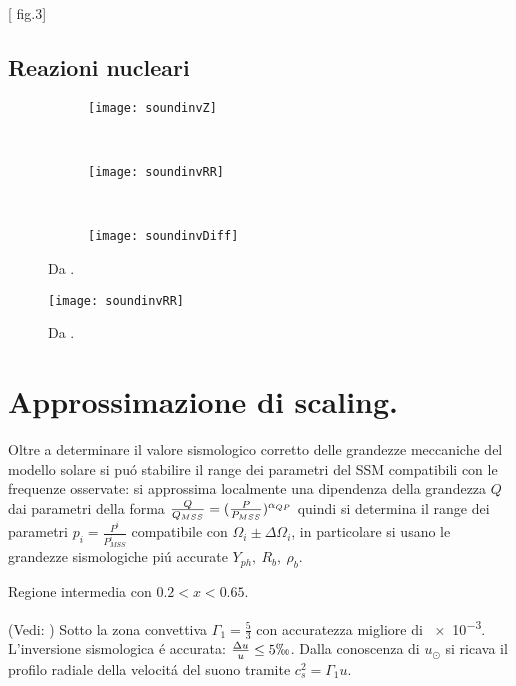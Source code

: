 \documentclass[../main.tex]{subfiles}
\begin{document}
[\cite{deg97helioseismology} fig.3]


\subsection{Reazioni nucleari}


\begin{figure}[!h]
\centering

\begin{subfigure}[t]{0.32\textwidth}
\texttt{[image: soundinvZ]}
\end{subfigure}
~
\begin{subfigure}[t]{0.32\textwidth}
\texttt{[image: soundinvRR]}
\end{subfigure}
~
\begin{subfigure}[t]{0.32\textwidth}
\texttt{[image: soundinvDiff]}
\end{subfigure}
\caption{Da \cite{boothroyd2003our}.}

\end{figure}

\begin{figure}[!h]
\centering
\texttt{[image: soundinvRR]}
\caption{Da \cite{boothroyd2003our}.}
\end{figure}

\section{Approssimazione di scaling.}

Oltre a determinare il valore sismologico corretto delle grandezze meccaniche del modello solare si pu\'o stabilire il range dei parametri del SSM compatibili con le frequenze osservate: si approssima localmente una dipendenza della grandezza $Q$ dai parametri della forma $\frac{Q}{Q_{MSS}}=(\frac{P}{P_{MSS}})^{\alpha_{QP}}$ quindi si determina il range dei parametri $p_i=\frac{P^i}{P_{MSS}^i}$ compatibile con $\Omega_i\pm\Delta\Omega_i$, in particolare si usano le grandezze sismologiche pi\'u accurate $Y_{ph},\ R_b,\ \rho_b$.

{Regione intermedia con $0.2<x<0.65$.}

(Vedi: \cite{bah04accurately})
Sotto la zona convettiva $\Gamma_1=\frac{5}{3}$ con accuratezza migliore di \num{e-3}. L'inversione sismologica \'e accurata: $\frac{\Delta u}{u}\leq5 \permil$. Dalla conoscenza di $u_{\odot}$ si ricava il profilo radiale della velocit\'a del suono tramite $c_s^2=\Gamma_1 u$.
\end{document}
